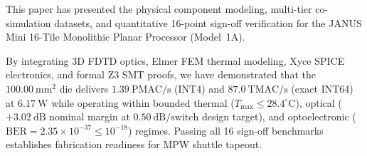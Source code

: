 \documentclass[journal]{IEEEtran}
\begin{document}
This paper has presented the physical component modeling, multi-tier co-simulation datasets, and quantitative 16-point sign-off verification for the JANUS Mini 16-Tile Monolithic Planar Processor (Model~1A). 

By integrating 3D FDTD optics, Elmer FEM thermal modeling, Xyce SPICE electronics, and formal Z3 SMT proofs, we have demonstrated that the $100.00~\mathrm{mm^2}$ die delivers $1.39~\mathrm{PMAC/s}$ (INT4) and $87.0~\mathrm{TMAC/s}$ (exact INT64) at $6.17~\mathrm{W}$ while operating within bounded thermal ($T_{\max} \le 28.4^\circ\mathrm{C}$), optical ($+3.02~\mathrm{dB}$ nominal margin at $0.50~\mathrm{dB/switch}$ design target), and optoelectronic ($\mathrm{BER} = 2.35 \times 10^{-37} \le 10^{-18}$) regimes. Passing all 16 sign-off benchmarks establishes fabrication readiness for MPW shuttle tapeout.



\end{document}
